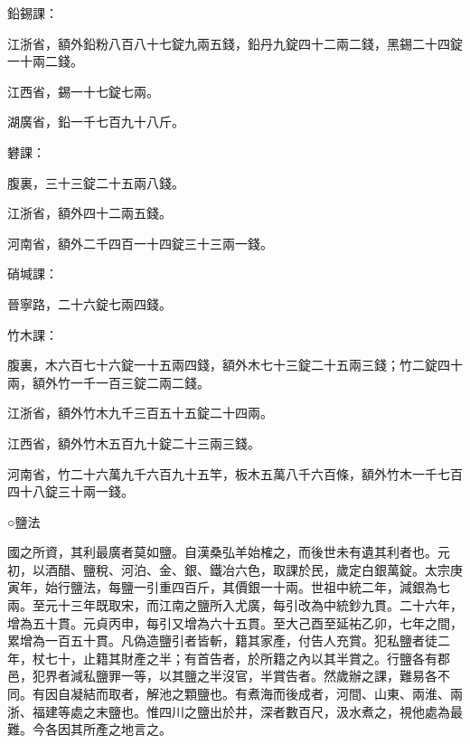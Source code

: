 \begin{pinyinscope}
 鉛錫課：



 江浙省，額外鉛粉八百八十七錠九兩五錢，鉛丹九錠四十二兩二錢，黑錫二十四錠一十兩二錢。



 江西省，錫一十七錠七兩。



 湖廣省，鉛一千七百九十八斤。



 礬課：



 腹裏，三十三錠二十五兩八錢。



 江浙省，額外四十二兩五錢。



 河南省，額外二千四百一十四錠三十三兩一錢。



 硝堿課：



 晉寧路，二十六錠七兩四錢。



 竹木課：



 腹裏，木六百七十六錠一十五兩四錢，額外木七十三錠二十五兩三錢；竹二錠四十兩，額外竹一千一百三錠二兩二錢。



 江浙省，額外竹木九千三百五十五錠二十四兩。



 江西省，額外竹木五百九十錠二十三兩三錢。



 河南省，竹二十六萬九千六百九十五竿，板木五萬八千六百條，額外竹木一千七百四十八錠三十兩一錢。



 ○鹽法



 國之所資，其利最廣者莫如鹽。自漢桑弘羊始榷之，而後世未有遺其利者也。元初，以酒醋、鹽稅、河泊、金、銀、鐵冶六色，取課於民，歲定白銀萬錠。太宗庚寅年，始行鹽法，每鹽一引重四百斤，其價銀一十兩。世祖中統二年，減銀為七兩。至元十三年既取宋，而江南之鹽所入尤廣，每引改為中統鈔九貫。二十六年，增為五十貫。元貞丙申，每引又增為六十五貫。至大己酉至延祐乙卯，七年之間，累增為一百五十貫。凡偽造鹽引者皆斬，籍其家產，付告人充賞。犯私鹽者徒二年，杖七十，止籍其財產之半；有首告者，於所籍之內以其半賞之。行鹽各有郡邑，犯界者減私鹽罪一等，以其鹽之半沒官，半賞告者。然歲辦之課，難易各不同。有因自凝結而取者，解池之顆鹽也。有煮海而後成者，河間、山東、兩淮、兩浙、福建等處之末鹽也。惟四川之鹽出於井，深者數百尺，汲水煮之，視他處為最難。今各因其所產之地言之。




\end{pinyinscope}
